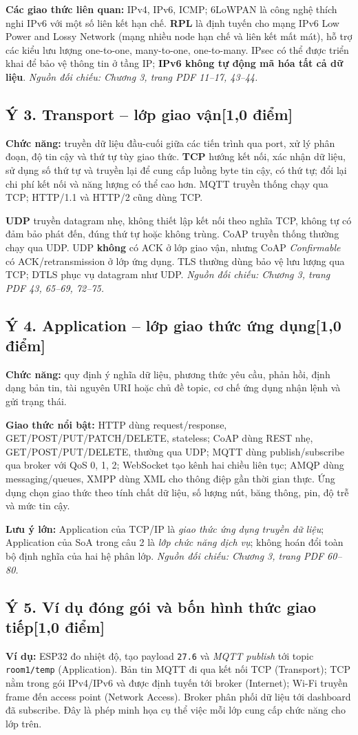 \documentclass[12pt,a4paper]{article}
\newcommand{\muc}[1]{\subsection*{#1\hfill{\color{teal}\normalsize [1,0 điểm]}}}
\newcommand{\nguon}[1]{{\small\itshape\color{navy}Nguồn đối chiếu: #1.}}
\begin{document}
\textbf{Các giao thức liên quan:} IPv4, IPv6, ICMP; 6LoWPAN là công nghệ thích nghi IPv6 với một số liên kết hạn chế. \textbf{RPL} là định tuyến cho mạng IPv6 Low Power and Lossy Network (mạng nhiều node hạn chế và liên kết mất mát), hỗ trợ các kiểu lưu lượng one-to-one, many-to-one, one-to-many. IPsec có thể được triển khai để bảo vệ thông tin ở tầng IP; \textbf{IPv6 không tự động mã hóa tất cả dữ liệu}. \nguon{Chương 3, trang PDF 11--17, 43--44}

\muc{Ý 3. Transport -- lớp giao vận}
\textbf{Chức năng:} truyền dữ liệu đầu-cuối giữa các tiến trình qua port, xử lý phân đoạn, độ tin cậy và thứ tự tùy giao thức. \textbf{TCP} hướng kết nối, xác nhận dữ liệu, sử dụng số thứ tự và truyền lại để cung cấp luồng byte tin cậy, có thứ tự; đổi lại chi phí kết nối và năng lượng có thể cao hơn. MQTT truyền thống chạy qua TCP; HTTP/1.1 và HTTP/2 cũng dùng TCP.

\textbf{UDP} truyền datagram nhẹ, không thiết lập kết nối theo nghĩa TCP, không tự có đảm bảo phát đến, đúng thứ tự hoặc không trùng. CoAP truyền thống thường chạy qua UDP. UDP \textbf{không} có ACK ở lớp giao vận, nhưng CoAP \emph{Confirmable} có ACK/retransmission ở lớp ứng dụng. TLS thường dùng bảo vệ lưu lượng qua TCP; DTLS phục vụ datagram như UDP. \nguon{Chương 3, trang PDF 43, 65--69, 72--75}

\muc{Ý 4. Application -- lớp giao thức ứng dụng}
\textbf{Chức năng:} quy định ý nghĩa dữ liệu, phương thức yêu cầu, phản hồi, định dạng bản tin, tài nguyên URI hoặc chủ đề topic, cơ chế ứng dụng nhận lệnh và gửi trạng thái.

\textbf{Giao thức nổi bật:} HTTP dùng request/response, GET/POST/PUT/PATCH/DELETE, stateless; CoAP dùng REST nhẹ, GET/POST/PUT/DELETE, thường qua UDP; MQTT dùng publish/subscribe qua broker với QoS 0, 1, 2; WebSocket tạo kênh hai chiều liên tục; AMQP dùng messaging/queues, XMPP dùng XML cho thông điệp gần thời gian thực. Ứng dụng chọn giao thức theo tính chất dữ liệu, số lượng nút, băng thông, pin, độ trễ và mức tin cậy.

\textbf{Lưu ý lớn:} Application của TCP/IP là \emph{giao thức ứng dụng truyền dữ liệu}; Application của SoA trong câu 2 là \emph{lớp chức năng dịch vụ}; không hoán đổi toàn bộ định nghĩa của hai hệ phân lớp. \nguon{Chương 3, trang PDF 60--80}

\muc{Ý 5. Ví dụ đóng gói và bốn hình thức giao tiếp}
\textbf{Ví dụ:} ESP32 đo nhiệt độ, tạo payload \texttt{27.6} và \emph{MQTT publish} tới topic \texttt{room1/temp} (Application). Bản tin MQTT đi qua kết nối TCP (Transport); TCP nằm trong gói IPv4/IPv6 và được định tuyến tới broker (Internet); Wi-Fi truyền frame đến access point (Network Access). Broker phân phối dữ liệu tới dashboard đã subscribe. Đây là phép minh họa cụ thể việc mỗi lớp cung cấp chức năng cho lớp trên.
\end{document}
